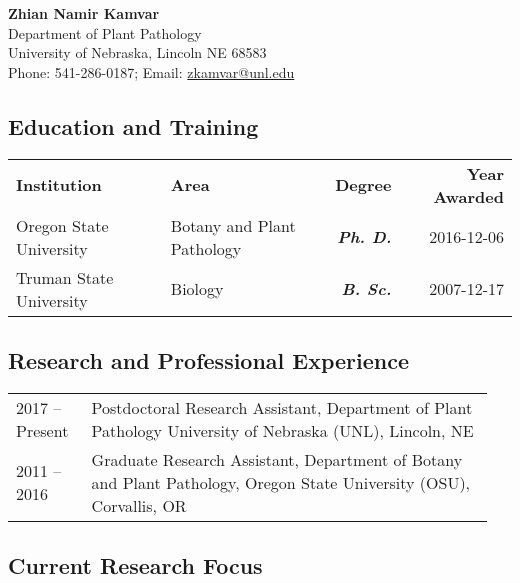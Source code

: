 \documentclass[12pt,letterpaper]{article}
\title{\ruleline{Biographical Sketch}}
\begin{document}
\maketitle

\begin{center}
{\bf Zhian Namir Kamvar}\\
Department of Plant Pathology \\
University of Nebraska, Lincoln NE 68583\\
Phone: 541-286-0187; Email: \href{mailto:zkamvar@unl.edu}{zkamvar@unl.edu}
\end{center}

\subsection*{Education and Training}

\begin{center}
\begin{tabular}{llrr}%
\textbf{Institution} & \textbf{Area} & \textbf{Degree} & \textbf{Year Awarded}\\
Oregon State University & Botany and Plant Pathology & \textit{\textbf{Ph. D.}} & 2016-12-06\\
Truman State University & Biology  & \textit{\textbf{B. Sc.}} &  2007-12-17
\end{tabular}
\end{center}



\subsection*{Research and Professional Experience}

\begin{tabular}{p{0.15\linewidth}p{0.8\linewidth}}
2017 --	Present & Postdoctoral Research Assistant, Department of Plant Pathology 
			      University of Nebraska (UNL), Lincoln, NE\\
2011 -- 2016    & Graduate Research Assistant, Department of Botany and Plant 
                  Pathology, Oregon State University (OSU), Corvallis, OR
\end{tabular}

\subsection*{Current Research Focus}
\end{document}
